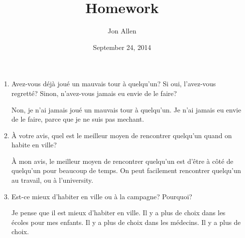 \documentclass[letterpaper]{article}
\begin{document}
\title{Homework}
\date{September 24, 2014}
\author{Jon Allen}
\maketitle
\begin{enumerate}
\item
Avez-vous déjà joué un mauvais tour à quelqu'un? Si oui, l'avez-vous regretté? Sinon, n'avez-vous jamais eu envie de le faire?

Non, je n'ai jamais joué un mauvais tour à quelqu'un. Je n'ai jamais eu envie de le faire, parce que je ne suis pas mechant.
\item
À votre avis, quel est le meilleur moyen de rencontrer quelqu'un quand on habite en ville?

À mon avis, le meilleur moyen de rencontrer quelqu'un est d'être à côté de quelqu'un pour beaucoup de temps. On peut facilement rencontrer quelqu'un au travail, ou à l'university.
\setcounter{enumi}{4}
\item
Est-ce mieux d'habiter en ville ou à la campagne? Pourquoi?

Je pense que il est mieux d'habiter en ville. Il y a plus de choix dans les écoles pour mes enfants. Il y a plus de choix dans les médecins. Il y a plus de choix.
\end{enumerate}
\end{document}

